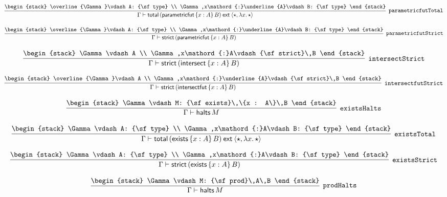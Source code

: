 \[
\infer[{\tt parametricfutTotal}]{\Gamma \vdash {\sf total}\,({\sf parametricfut}\,\{x : A\}\,B)\:{\sf ext}\:\langle \star ,\lambda x.\,\star \rangle }{
\begin{stack}
\overline{\Gamma}\vdash A: {\sf type}
\\
\Gamma ,x\mathord{:}\underline{A}\vdash B: {\sf type}
\end{stack}}
\]

\[
\infer[{\tt parametricfutStrict}]{\Gamma \vdash {\sf strict}\,({\sf parametricfut}\,\{x : A\}\,B)}{
\begin{stack}
\overline{\Gamma}\vdash A: {\sf type}
\\
\Gamma ,x\mathord{:}\underline{A}\vdash B: {\sf type}
\end{stack}}
\]

\[
\infer[{\tt intersectStrict}]{\Gamma \vdash {\sf strict}\,({\sf intersect}\,\{x : A\}\,B)}{
\begin{stack}
\Gamma \vdash A
\\
\Gamma ,x\mathord{:}A\vdash {\sf strict}\,B
\end{stack}}
\]

\[
\infer[{\tt intersectfutStrict}]{\Gamma \vdash {\sf strict}\,({\sf intersectfut}\,\{x : A\}\,B)}{
\begin{stack}
\overline{\Gamma}\vdash A
\\
\Gamma ,x\mathord{:}\underline{A}\vdash {\sf strict}\,B
\end{stack}}
\]

\[
\infer[{\tt existsHalts}]{\Gamma \vdash {\sf halts}\,M}{
\begin{stack}
\Gamma \vdash M: {\sf exists}\,\{x : A\}\,B
\end{stack}}
\]

\[
\infer[{\tt existsTotal}]{\Gamma \vdash {\sf total}\,({\sf exists}\,\{x : A\}\,B)\:{\sf ext}\:\langle \star ,\lambda x.\,\star \rangle }{
\begin{stack}
\Gamma \vdash A: {\sf type}
\\
\Gamma ,x\mathord{:}A\vdash B: {\sf type}
\end{stack}}
\]

\[
\infer[{\tt existsStrict}]{\Gamma \vdash {\sf strict}\,({\sf exists}\,\{x : A\}\,B)}{
\begin{stack}
\Gamma \vdash A: {\sf type}
\\
\Gamma ,x\mathord{:}A\vdash B: {\sf type}
\end{stack}}
\]

\[
\infer[{\tt prodHalts}]{\Gamma \vdash {\sf halts}\,M}{
\begin{stack}
\Gamma \vdash M: {\sf prod}\,A\,B
\end{stack}}
\]


